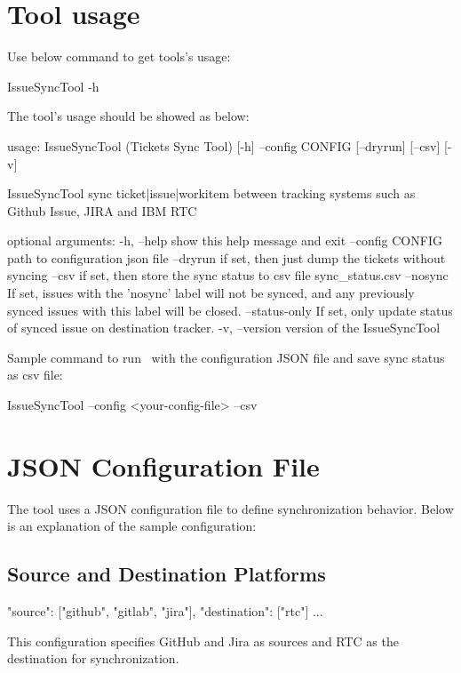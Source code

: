 \hypertarget{tool-usage}{%
\section{Tool usage}\label{tool-usage}}

Use below command to get tools's usage:

\begin{pythonlog}
IssueSyncTool -h
\end{pythonlog}

The tool's usage should be showed as below:

\begin{pythonlog}
usage: IssueSyncTool (Tickets Sync Tool) [-h] --config CONFIG [--dryrun] [--csv] [-v]

IssueSyncTool sync ticket|issue|workitem between tracking systems such as Github Issue, JIRA and IBM RTC

optional arguments:
  -h, --help       show this help message and exit
  --config CONFIG  path to configuration json file
  --dryrun         if set, then just dump the tickets without syncing
  --csv            if set, then store the sync status to csv file sync_status.csv
  --nosync         If set, issues with the 'nosync' label will not be synced,
                   and any previously synced issues with this label will be closed.
  --status-only    If set, only update status of synced issue on destination tracker.
  -v, --version    version of the IssueSyncTool
\end{pythonlog}

Sample command to run \pkg\ with the configuration JSON file and save sync
status as csv file:

\begin{pythonlog}
IssueSyncTool --config <your-config-file> --csv
\end{pythonlog}

\hypertarget{config-file}{%
\section{JSON Configuration File}\label{config-file}}

The tool uses a JSON configuration file to define synchronization behavior.
Below is an explanation of the sample configuration:

\subsection{Source and Destination Platforms}
\begin{pythoncode}
{
   "source": ["github", "gitlab", "jira"],
   "destination": ["rtc"]
   ...
}
\end{pythoncode}
This configuration specifies GitHub and Jira as sources and RTC as the
destination for synchronization.


